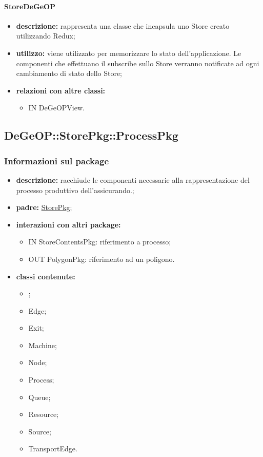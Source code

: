 \paragraph{StoreDeGeOP}
\begin{itemize}
	\item \textbf{descrizione:} rappresenta una classe che incapsula uno Store creato utilizzando Redux;
	\item \textbf{utilizzo:} viene utilizzato per memorizzare lo stato dell'applicazione.
	Le componenti che effettuano il subscribe sullo Store verranno notificate ad ogni cambiamento di stato dello Store;
	\item \textbf{relazioni con altre classi:} 
	\begin{itemize}
		\item IN DeGeOPView.
	\end{itemize}
\end{itemize}
\newpage
\subsection{DeGeOP::StorePkg::ProcessPkg}
\label{pkg::ProcessPkg}
\subsubsection{Informazioni sul package}
\begin{itemize}
	\item \textbf{descrizione:} racchiude le componenti necessarie alla rappresentazione del processo produttivo dell'assicurando.;
	\item \textbf{padre:} \hyperref[pkg::StorePkg]{StorePkg};
	\item \textbf{interazioni con altri package:} 
	\begin{itemize}
		\item IN StoreContentsPkg: riferimento a processo;
		\item OUT PolygonPkg: riferimento ad un poligono.
	\end{itemize}
	\item \textbf{classi contenute:}
	\begin{itemize}
		\item {};
		\item Edge;
		\item Exit;
		\item Machine;
		\item Node;
		\item Process;
		\item Queue;
		\item Resource;
		\item Source;
		\item TransportEdge.
	\end{itemize}
\end{itemize}
